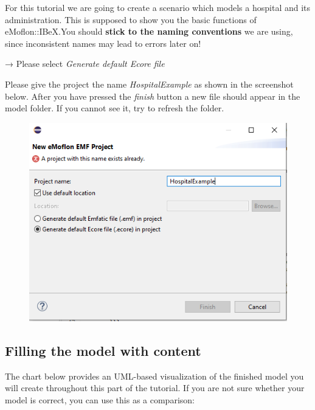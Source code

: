 For this tutorial we are going to create a scenario which models a hospital and its administration. This is supposed to show you the basic functions of eMoflon::IBeX.\newline You should \textbf{stick to the naming conventions} we are using, since inconsistent names may lead to errors later on!\newline

\centering
→ Please select \textit{\textsf{Generate default Ecore file}}\newline

\raggedright
Please give the project the name \textit{\textsf{HospitalExample}} as shown in the screenshot below. After you have pressed the \textit{\textsf{finish}} button a new file should appear in the model folder. If you cannot see it, try to refresh the folder.\newline

\begin{figure}[h]
    \centering
    \includegraphics[scale=0.7]{pictures/project_creation.png}
    \caption{}
    \label{project creation}
\end{figure}
\clearpage
\subsection{Filling the model with content}

 The chart below provides an UML-based visualization of the finished model you will create throughout this part of the tutorial. If you are not sure whether your model is correct, you can use this as a comparison:\newline
 
